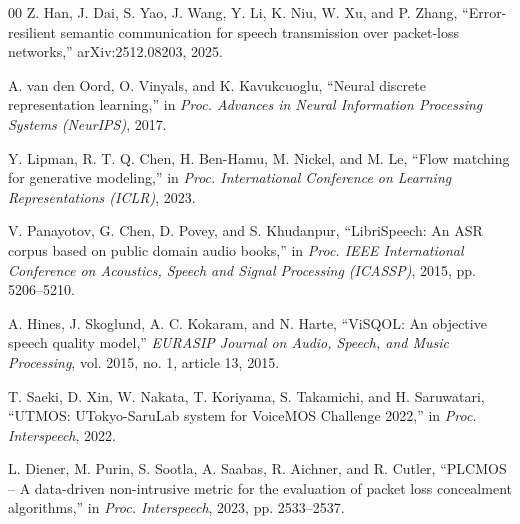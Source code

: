 \documentclass[conference]{IEEEtran}
\begin{document}
\begin{thebibliography}{00}
 Z. Han, J. Dai, S. Yao, J. Wang, Y. Li, K. Niu, W. Xu, and P. Zhang, ``Error-resilient semantic communication for speech transmission over packet-loss networks,'' arXiv:2512.08203, 2025.

 A. van den Oord, O. Vinyals, and K. Kavukcuoglu, ``Neural discrete representation learning,'' in \emph{Proc. Advances in Neural Information Processing Systems (NeurIPS)}, 2017.

 Y. Lipman, R. T. Q. Chen, H. Ben-Hamu, M. Nickel, and M. Le, ``Flow matching for generative modeling,'' in \emph{Proc. International Conference on Learning Representations (ICLR)}, 2023.

 V. Panayotov, G. Chen, D. Povey, and S. Khudanpur, ``LibriSpeech: An ASR corpus based on public domain audio books,'' in \emph{Proc. IEEE International Conference on Acoustics, Speech and Signal Processing (ICASSP)}, 2015, pp. 5206--5210.

 A. Hines, J. Skoglund, A. C. Kokaram, and N. Harte, ``ViSQOL: An objective speech quality model,'' \emph{EURASIP Journal on Audio, Speech, and Music Processing}, vol. 2015, no. 1, article 13, 2015.

 T. Saeki, D. Xin, W. Nakata, T. Koriyama, S. Takamichi, and H. Saruwatari, ``UTMOS: UTokyo-SaruLab system for VoiceMOS Challenge 2022,'' in \emph{Proc. Interspeech}, 2022.

 L. Diener, M. Purin, S. Sootla, A. Saabas, R. Aichner, and R. Cutler, ``PLCMOS -- A data-driven non-intrusive metric for the evaluation of packet loss concealment algorithms,'' in \emph{Proc. Interspeech}, 2023, pp. 2533--2537.

\end{thebibliography}
\end{document}

